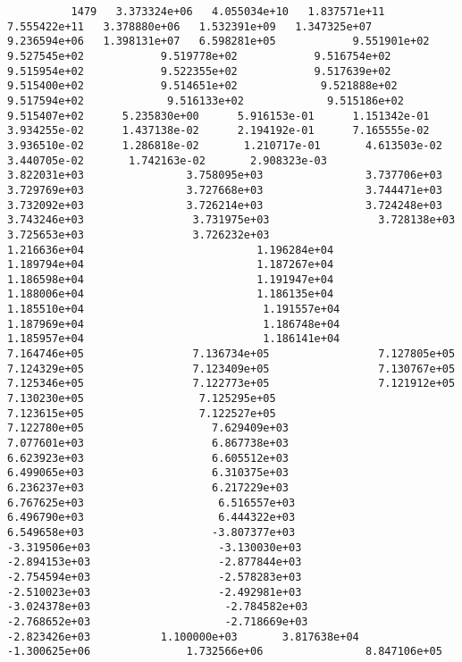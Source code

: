\documentclass{article}
\begin{document}
{\tiny 
\begin{verbatim}
          1479   3.373324e+06   4.055034e+10   1.837571e+11   7.555422e+11   3.378880e+06   1.532391e+09   1.347325e+07   9.236594e+06   1.398131e+07   6.598281e+05            9.551901e+02            9.527545e+02            9.519778e+02            9.516754e+02            9.515954e+02            9.522355e+02            9.517639e+02            9.515400e+02            9.514651e+02             9.521888e+02             9.517594e+02             9.516133e+02             9.515186e+02             9.515407e+02      5.235830e+00      5.916153e-01      1.151342e-01      3.934255e-02      1.437138e-02      2.194192e-01      7.165555e-02      3.936510e-02      1.286818e-02       1.210717e-01       4.613503e-02       3.440705e-02       1.742163e-02       2.908323e-03                3.822031e+03                3.758095e+03                3.737706e+03                3.729769e+03                3.727668e+03                3.744471e+03                3.732092e+03                3.726214e+03                3.724248e+03                 3.743246e+03                 3.731975e+03                 3.728138e+03                 3.725653e+03                 3.726232e+03                           1.216636e+04                           1.196284e+04                           1.189794e+04                           1.187267e+04                           1.186598e+04                           1.191947e+04                           1.188006e+04                           1.186135e+04                           1.185510e+04                            1.191557e+04                            1.187969e+04                            1.186748e+04                            1.185957e+04                            1.186141e+04                 7.164746e+05                 7.136734e+05                 7.127805e+05                 7.124329e+05                 7.123409e+05                 7.130767e+05                 7.125346e+05                 7.122773e+05                 7.121912e+05                  7.130230e+05                  7.125295e+05                  7.123615e+05                  7.122527e+05                  7.122780e+05                    7.629409e+03                    7.077601e+03                    6.867738e+03                    6.623923e+03                    6.605512e+03                    6.499065e+03                    6.310375e+03                    6.236237e+03                    6.217229e+03                     6.767625e+03                     6.516557e+03                     6.496790e+03                     6.444322e+03                     6.549658e+03                    -3.807377e+03                    -3.319506e+03                    -3.130030e+03                    -2.894153e+03                    -2.877844e+03                    -2.754594e+03                    -2.578283e+03                    -2.510023e+03                    -2.492981e+03                     -3.024378e+03                     -2.784582e+03                     -2.768652e+03                     -2.718669e+03                     -2.823426e+03           1.100000e+03       3.817638e+04                         -1.300625e+06               1.732566e+06                8.847106e+05 

\end{verbatim}}
\end{document}

